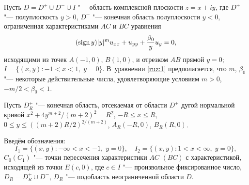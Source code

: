 





\date{25/III/2014}

\makerutitle



Пусть $D={D^{+}}\cup D^{-}\cup I$ "--- область комплексной плоскости $z = x + iy$, 
где ${D^ + }$ "--- полуплоскость $y > 0$, $D^ {- }$ "--- конечная область полуплоскости $y < 0$, ограниченная характеристиками $AC$ и $BC$ уравнения
\begin{equation}
(\mathop{\rm sign}y){|y|^m}u_{xx}+u_{yy}+\frac{\beta_0}{y}u_y=0,
\label{ruz:1}
\end{equation}
исходящими из точек $A( - 1, 0)$, $B(1, 0)$, и отрезком $AB$ прямой $y = 0$; $I=\{(x,y) : -1<x<1, \; y=0\}$. 
В~уравнении \eqref{ruz:1} предполагается, что $m$, $\beta_0$ "--- некоторые действительные числа, удовлетворяющие
условиям $m > 0$, $- m/2 < \beta_0 < 1$.

Пусть $D_R^{+}$ "--- конечная область, отсекаемая от области $D^{+}$ дугой нормальной кривой $x^2+4y^{m + 2}/(m+2)^2=R^2$,
$- R \le x \le R$, $0 \le y \le \left((m+2)R/2\right)^{2/(m + 2)}$,
$A_R(-R, 0)$, $B_R(R, 0)$.

Введём обозначения: 
$$I_1=\{(x,y):-\infty  < x <- 1,\; y = 0\},\quad I_2=\{(x,y):1<x<\infty, \; y=0\},$$ 
$C_0(C_1)$ "--- точки пересечения характеристики $AC$ $(BC)$ с характеристикой, исходящей из
точки $E(c, 0)$, 
где $c \in I$ "--- произвольное фиксированное число, ${D_R} = D_R^{+}\cup D^-$, $D_R$ "--- подобласть неограниченной области $D$.


